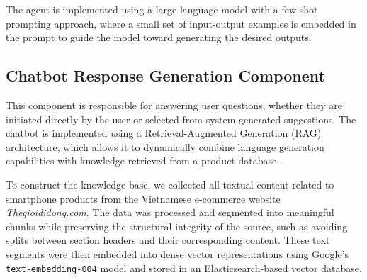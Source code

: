 
The agent is implemented using a large language model with a few-shot prompting approach, where a small set of input-output examples is embedded in the prompt to guide the model toward generating the desired outputs.


\subsection{Chatbot Response Generation Component}
\label{sec:chatbot_response}

This component is responsible for answering user questions, whether they are initiated directly by the user or selected from system-generated suggestions. The chatbot is implemented using a Retrieval-Augmented Generation (RAG) architecture, which allows it to dynamically combine language generation capabilities with knowledge retrieved from a product database.



To construct the knowledge base, we collected all textual content related to smartphone products from the Vietnamese e-commerce website \textit{Thegioididong.com}. The data was processed and segmented into meaningful chunks while preserving the structural integrity of the source, such as avoiding splits between section headers and their corresponding content. These text segments were then embedded into dense vector representations using Google's \texttt{text-embedding-004} model and stored in an Elasticsearch-based vector database.


